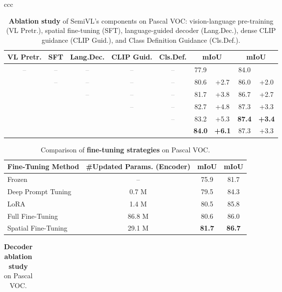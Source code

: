 \documentclass[10pt,twocolumn,letterpaper]{article}
\newcommand{\ours}{SemiVL}
\newcommand*{\y}{\checkmark}
\newcommand*{\n}{\textcolor{gray}{--}}
\newcommand*{\z}{\phantom{0}}
\newcommand*{\blarrow}{\rotatebox[origin=c]{270}{}}
\begin{document}
\begin{figure*}
\begin{tabular}{ccc}
\begin{table}
\centering
\caption{\textbf{Ablation study} of \ours's components on Pascal VOC: vision-language pre-training (VL Pretr.), spatial fine-tuning (SFT), language-guided decoder (Lang.Dec.), dense CLIP guidance (CLIP Guid.), and Class Definition Guidance (Cls.Def.).}
\label{tab:ablation}
\scriptsize
\setlength{\tabcolsep}{3pt}
\begin{tabular}{ccccccccc}
\toprule
VL Pretr. & SFT & Lang.Dec. & CLIP Guid. & Cls.Def. & \multicolumn{2}{c}{mIoU} & \multicolumn{2}{c}{mIoU} \\
\midrule
\n & \n & \n & \n & \n & 77.9 & \blarrow & 84.0 & \blarrow\\
\y & \n & \n & \n & \n & 80.6 & +2.7 & 86.0 & +2.0\\
\y & \y & \n & \n & \n & 81.7 & +3.8 & 86.7 & +2.7\\
\y & \y & \y & \n & \n & 82.7 & +4.8 & 87.3 & +3.3\\
\y & \y & \y & \y & \n & 83.2 & +5.3 & \textbf{87.4} & \textbf{+3.4}\\
\y & \y & \y & \y & \y & \textbf{84.0} & \textbf{+6.1} & 87.3 & +3.3 \\
\bottomrule
\end{tabular}
\end{table} 
\begin{table}\centering
\caption{Comparison of \textbf{fine-tuning strategies} on Pascal VOC.}
\label{tab:finetuning}
\scriptsize
\setlength{\tabcolsep}{3pt}
\begin{tabular}{lccc}
\toprule
Fine-Tuning Method  & \#Updated Params. (Encoder) & mIoU & mIoU \\
\midrule
Frozen              & -- & 75.9 & 81.7 \\
Deep Prompt Tuning~\cite{zhou2023zegclip}  & \z0.7 M & 79.5 & 84.3 \\
LoRA~\cite{hu2021lora}                & \z1.4 M  & 80.5 & 85.8 \\
Full Fine-Tuning    & 86.8 M  & 80.6 & 86.0 \\
Spatial Fine-Tuning & 29.1 M & \textbf{81.7} & \textbf{86.7} \\
\bottomrule
\end{tabular}
\end{table} 
\begin{table}
\parbox[t][][t]{.45\linewidth}{
\centering
\caption{\textbf{Decoder ablation study} on Pascal VOC.}
\label{tab:decoder_study}
\scriptsize
\setlength{\tabcolsep}{1pt}
\begin{tabular}{lcc}

\end{tabular}}
\end{table}
\end{tabular}
\end{figure*}
\end{document}
